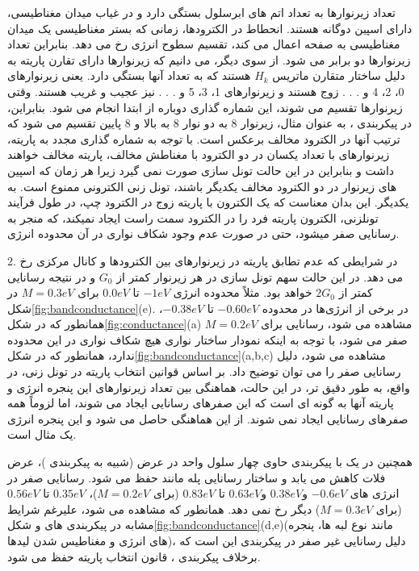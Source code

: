 تعداد زیر‌نوارها به تعداد اتم های ابرسلول بستگی دارد و در غیاب میدان مغناطیسی، دارای اسپین دوگانه هستند. انحطاط در الکترودها، زمانی که بستر مغناطیسی یک میدان مغناطیسی به صفحه اعمال می کند، تقسیم سطوح انرژی رخ می دهد. بنابراین تعداد زیر‌نوارها دو برابر می شود. از سوی دیگر، می دانیم که زیر‌نوارها دارای تقارن پاریته به دلیل ساختار متقارن ماتریس $H_k$ هستند که به تعداد آنها بستگی دارد. یعنی زیر‌نوارهای 0، 2، 4 و . . . زوج هستند و زیر‌نوارهای 1، 3، 5 و . . . نیز عجیب و غریب هستند. وقتی زیر‌نوارها تقسیم می شوند، این شماره گذاری دوباره از ابتدا انجام می شود. بنابراین، در پیکربندی ، به عنوان مثال، زیر‌نوار 8 به دو نوار 8 به بالا و 8 پایین تقسیم می شود که ترتیب آنها در الکترود مخالف برعکس است. با توجه به شماره گذاری مجدد به پاریته، زیر‌نوارهای با تعداد یکسان در دو الکترود با مغناطش مخالف، پاریته مخالف خواهند داشت و بنابراین در این حالت تونل سازی صورت نمی گیرد زیرا هر زمان که اسپین های زیر‌نوار در دو الکترود مخالف یکدیگر باشند، تونل زنی الکترونی ممنوع است. به یکدیگر. این بدان معناست که یک الکترون با پاریته زوج در الکترود چپ، در طول فرآیند تونلزنی، الکترون پاریته فرد را در الکترود سمت راست ایجاد نمیکند، که منجر به رسانایی صفر میشود، حتی در صورت عدم وجود شکاف نواری در آن محدوده انرژی. 

2. در شرایطی که عدم تطابق پاریته در زیر‌نوارهای بین الکترودها و کانال مرکزی رخ می دهد. در این حالت سهم تونل سازی در هر زیر‌نوار کمتر از $G_0$ و در نتیجه رسانایی کمتر از $2 G_0$ خواهد بود. مثلاً محدوده انرژی $-1 eV$ تا $0.0 eV$ برای $M = 0.3 eV$ در شکل\ref{fig:bandconductance}(e). در برخی از انرژی‌ها در محدوده $-0.60 eV$ تا $-0.38 eV$، همانطور که در شکل\ref{fig:conductance}(a) مشاهده می شود، رسانایی برای $M = 0.2 eV$ صفر می شود، با توجه به اینکه نمودار ساختار نواری هیچ شکاف نواری در این محدوده ندارد، همانطور که در شکل\ref{fig:bandconductance}(a,b,c) مشاهده می شود، دلیل رسانایی صفر را می توان توضیح داد. بر اساس قوانین انتخاب پاریته در تونل زنی، در واقع، به طور دقیق تر، در این حالت، هماهنگی بین تعداد زیر‌نوارهای این پنجره انرژی و پاریته آنها به گونه ای است که این صفرهای رسانایی ایجاد می شوند، اما لزوماً همه صفرهای رسانایی ایجاد نمی شوند. از این هماهنگی حاصل می شود و این پنجره انرژی یک مثال است.

همچنین در یک  با پیکربندی  حاوی چهار سلول واحد در عرض (شبیه به پیکربندی )، عرض فلات کاهش می یابد و ساختار رسانایی پله مانند حفظ می شود. رسانایی صفر در انرژی های $-0.6 eV$ و$0.38 eV$ و$0.63 eV$ تا $0.83 eV$ (برای $M = 0.2 eV$)، $0.35 eV$ تا $0.56 eV$ (برای $M = 0.3 eV$) دیگر رخ نمی دهد. همانطور که مشاهده می شود، علیرغم شرایط مشابه در پیکربندی های  و  شکل\ref{fig:bandconductance}(d,e)(مانند نوع لبه ها، پنجره های انرژی و مغناطیس شدن لیدها)، دلیل رسانایی غیر صفر در پیکربندی  این است که برخلاف پیکربندی ، قانون انتخاب پاریته حفظ می شود. 

